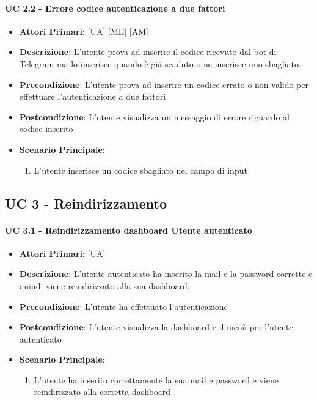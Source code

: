 			\paragraph{UC 2.2 - Errore codice autenticazione a due fattori}
			\begin{itemize}
				\item \textbf{Attori Primari}: [UA] [ME] [AM]
				\item \textbf{Descrizione}: L'utente prova ad inserire il codice ricevuto dal bot di Telegram ma lo inserisce quando è già scaduto o ne inserisce uno sbagliato.
				\item \textbf{Precondizione}: L'utente prova ad inserire un codice errato o non valido per effettuare l'autenticazione a due fattori
				\item \textbf{Postcondizione}: L'utente visualizza un messaggio di errore riguardo al codice inserito
				\item \textbf{Scenario Principale}:
				\begin{enumerate}
					\item{L'utente inserisce un codice sbagliato nel campo di input}
				\end{enumerate}	
			\end{itemize}

		\subsection{UC 3 - Reindirizzamento}

			\paragraph{UC 3.1 - Reindirizzamento dashboard Utente autenticato}
			\begin{itemize}
				\item \textbf{Attori Primari}: [UA]
				\item \textbf{Descrizione}: L'utente autenticato ha inserito la mail e la password corrette e quindi viene reindirizzato alla sua dashboard.
				\item \textbf{Precondizione}: L'utente ha effettuato l'autenticazione
				\item \textbf{Postcondizione}: L'utente visualizza la dashboard e il menù per l'utente autenticato
				\item \textbf{Scenario Principale}:
				\begin{enumerate}
					\item{L'utente ha inserito correttamente la sua mail e password e viene reindirizzato alla corretta dashboard}
					
				\end{enumerate}	
			\end{itemize}

